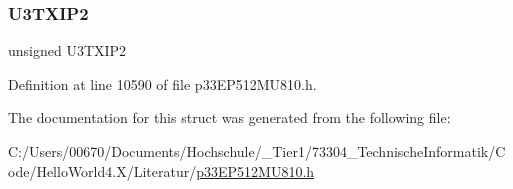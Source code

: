 \subsubsection{\texorpdfstring{U3\+T\+X\+I\+P2}{U3TXIP2}}
{\footnotesize\ttfamily unsigned U3\+T\+X\+I\+P2}



Definition at line 10590 of file p33\+E\+P512\+M\+U810.\+h.



The documentation for this struct was generated from the following file\+:\begin{DoxyCompactItemize}
\item 
C\+:/\+Users/00670/\+Documents/\+Hochschule/\+\_\+\+Tier1/73304\+\_\+\+Technische\+Informatik/\+Code/\+Hello\+World4.\+X/\+Literatur/\hyperlink{p33_e_p512_m_u810_8h}{p33\+E\+P512\+M\+U810.\+h}\end{DoxyCompactItemize}
